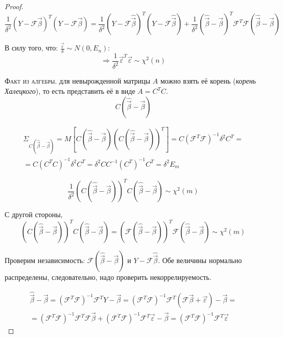 \begin{proof}
  \[
    \frac{1}{\delta^2} (Y - \mathcal{F} \vec{\beta})^T (Y - \mathcal{F} \vec{\beta})
    = \frac{1}{\delta^2} 
    (Y - \mathcal{F} \hat{\vec{\beta}})^T
    (Y - \mathcal{F} \hat{\vec{\beta}}) 
    + \frac{1}{\delta^2} 
    (\hat{\vec{\beta}} - \vec{\beta})^T 
    \mathcal{F}^T \mathcal{F}
    (\hat{\vec{\beta}} - \vec{\beta})
  \]

  В силу того, что:
  $\frac{\vec{\varepsilon}}{\delta} \sim N(0, E_n)$:
  \[
    \Rightarrow 
    \frac{1}{\delta^2} \vec{\varepsilon}^T \vec{\varepsilon}
    \sim \chi^2(n)
  \]

  \textsc{Факт из алгебры}. для невырожденной матрицы $A$ можно взять её корень
  (\emph{корень Халецкого}), то есть представить её в виде 
  $A = C^T C$.
  \[
    C (\hat{\vec{\beta}} - \vec{\beta})
  \]

  \begin{multline*}
    \Sigma_{C (\hat{\vec{\beta}} - \vec{\beta})}
    = M \left[
      C (\hat{\vec{\beta}} - \vec{\beta})
      \left( C (\hat{\vec{\beta}} - \vec{\beta}) \right)^T \right]
    = C ( \mathcal{F}^T \mathcal{F} )^{-1} \delta^2 C^T = \\
    = C (C^T C)^{-1} \delta^2 C^T
    = \delta^2 C C^{-1} (C^T)^{-1} C^T
    = \delta^2 E_m
  \end{multline*}

  \[
    \frac{1}{\delta^2}
    ( C (\hat{\vec{\beta}} - \vec{\beta}) )^T
    C (\hat{\vec{\beta}} - \vec{\beta})
    \sim
    \chi^2 (m)
  \]

  С другой стороны,
  \[
    ( C (\hat{\vec{\beta}} - \vec{\beta}) )^T
    C (\hat{\vec{\beta}} - \vec{\beta})
    = 
    ( \mathcal{F} (\hat{\vec{\beta}} - \vec{\beta}) )^T
    \mathcal{F} (\hat{\vec{\beta}} - \vec{\beta})
    \sim
    \chi^2 (m)
  \]

  Проверим независимость: $\mathcal{F} (\hat{\vec{\beta}} - \vec{\beta})$ и $Y - \mathcal{F} \hat{\vec{\beta}}$.
  Обе величины нормально распределены, следовательно, надо проверить некоррелируемость.

  \begin{multline*}
    \hat{\vec{\beta}} - \vec{\beta}
    = (\mathcal{F}^T \mathcal{F})^{-1} \mathcal{F}^T Y - \vec{\beta}
    = (\mathcal{F}^T \mathcal{F})^{-1} \mathcal{F}^T ( \mathcal{F} \vec{\beta} + \vec{\varepsilon} ) - \vec{\beta} = \\
    = (\mathcal{F}^T \mathcal{F})^{-1} \mathcal{F}^T \mathcal{F} \vec{\beta}
    + (\mathcal{F}^T \mathcal{F})^{-1} \mathcal{F}^T \vec{\varepsilon} - \vec{\beta}
    = (\mathcal{F}^T \mathcal{F})^{-1} \mathcal{F}^T \vec{\varepsilon}
  \end{multline*}


\end{proof}
